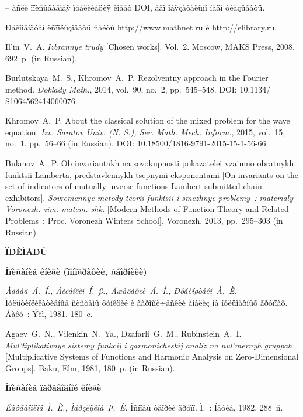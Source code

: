 \documentclass[12pt]{book}
\theoremstyle{plain}
\theoremstyle{remark}
\theoremstyle{plain}
\theoremstyle{definition}
\begin{document}
--  åñëè îïèñûâàåìàÿ ïóáëèêàöèÿ èìååò DOI, åãî îáÿçàòåëüíî íàäî
óêàçûâàòü.


\smallskip

Ðåêîìåíäóåì èñïîëüçîâàòü ñàéòû http://www.mathnet.ru è
http://elibrary.ru.

\begin{Etwocolbib}%
Il'in~V.~A. \textit{Izbrannye trudy} [Chosen works]. Vol.~2.
Moscow, MAKS Press, 2008. 692~p. (in Russian).

Burlutskaya~M.~S.,
Khromov~A.~P. Rezolventny approach in the Fourier method.
\textit{Doklady Math.}, 2014, vol.~90, no.~2, pp.~545--548. DOI:
10.1134/ S1064562414060076.

Khromov~A.~P. About the classical solution of the mixed problem
for the wave equation. \textit{Izv. Saratov Univ. (N. S.), Ser.
Math. Mech. Inform.}, 2015, vol.~15, no.~1, pp.~56--66 (in
Russian). DOI: 10.18500/1816-9791-2015-15-1-56-66.

Bulanov~A.~P. Ob invariantakh na sovokupnosti pokazatelei vzaimno
obratnykh funktsii Lamberta, predstavlennykh tsepnymi eksponentami
[On invariants on the set of indicators of mutually inverse
functions Lambert submitted chain exhibitors]. \textit{Sovremennye
metody teorii funktsii i smezhnye problemy~: materialy Voronezh.
zim. matem. shk.} [Modern Methods of Function Theory and Related
Problems~: Proc. Voronezh Winters School], Voronezh, 2013,
pp.~295--303 (in Russian).
\end{Etwocolbib}%

\newpage

\begin{center}
\textbf{ÏÐÈÌÅÐÛ}
\end{center}

\textbf{Îïèñàíèå êíèãè (ìîíîãðàôèè,
ñáîðíèêè)}

\textit{Àãàåâ~Ã.~Í., Âèëåíêèí~Í.~ß., Äæàôàðëè~Ã.~Ì.,
Ðóáèíøòåéí~À.~È.} Ìóëüòèïëèêàòèâíûå ñèñòåìû ôóíêöèé è
ãàðìîíè÷åñêèé àíàëèç íà íóëüìåðíûõ ãðóïïàõ. Áàêó~: Ýëì, 1981.
180~c.

Agaev~G.~N., Vilenkin~N.~Ya., Dzafarli~G.~M., Rubinstein~A.~I.
\textit{Mul'tiplikativnye sistemy funkcij i garmonicheskij analiz
na nul'mernyh gruppah} [Multiplicative Systems of Functions and
Harmonic Analysis on Zero-Dimensional Groups]. Baku, Elm, 1981,
180~p.  (in Russian).

\textbf{Îïèñàíèå ïåðåâîäíîé
êíèãè}

\textit{Êàðãàïîëîâ~Ì.~È., Ìåðçëÿêîâ~Þ.~È.} Îñíîâû òåîðèè ãðóïï.
Ì.~: Íàóêà, 1982. 288~ñ.
\end{document}
